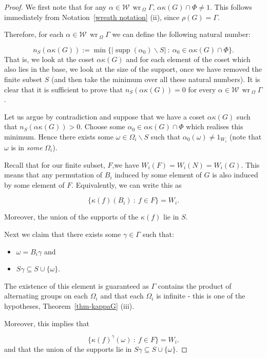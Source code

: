 \documentclass[11pt,a4paper]{amsart}
\renewcommand{\setminus}{\smallsetminus}
\theoremstyle{definition}
\theoremstyle{remark}
\newcommand{\supp}{\operatorname{supp}}
\renewcommand{\wr}{\operatorname{\,wr\,}}
\begin{document}
\begin{proof}
We first note that for any $\alpha \in \mathcal{W}\wr_\Omega \Gamma$, $\alpha \kappa(G) \cap \Phi \neq 1$. This follows immediately from Notation~\ref{wreath notation} (ii), since $\rho(G) = \Gamma$. 

Therefore, for each $\alpha \in \mathcal{W}\wr_\Omega \Gamma$ we can define the following natural number: 

$$
n_S(\alpha \kappa(G)) := \min  \{ |\supp(\alpha_0) \setminus S| \ : \ \alpha_0 \in  \alpha \kappa(G) \cap \Phi \}.  
$$
That is, we look at the coset $\alpha \kappa(G)$ and for each element of the coset which also lies in the base, we look at the size of the support, once we have removed the finite subset $S$ (and then take the minimum over all these natural numbers). It is clear that it is sufficient to prove that $n_S(\alpha \kappa(G)) = 0 $ for every $\alpha \in \mathcal{W}\wr_\Omega \Gamma$. 

Let us argue by contradiction and suppose that we have a coset $\alpha \kappa(G)$ such that $n_S(\alpha \kappa(G)) > 0 $. Choose some $\alpha_0 \in  \alpha \kappa(G) \cap \Phi$ which realises this minimum. Hence there exists some $\omega \in \Omega_i \setminus S$ such that $\alpha_0(\omega) \neq 1_{W_i}$ (note that $\omega$ is in \emph{some } $\Omega_i$). 


Recall that for our finite subset, $F$,we have $W_i(F) = W_i(N)=W_i(G)$. This means that any permutation of $B_i$ induced by some element of $G$ is also induced by some element of $F$. Equivalently, we can write this as

$$
\{ \kappa(f) (B_i) \ : \ f \in F \} = W_i. 
$$

Moreover, the union of the supports of the $\kappa(f)$ lie in $S$. 

Next we claim that there exists some $\gamma \in \Gamma$ such that:
\begin{itemize}
	\item $\omega  = B_i \gamma$ and 
	\item $S \gamma \subseteq S \cup \{ \omega \}$. 
\end{itemize}

The existence of this element is guaranteed as $\Gamma$ contains the product of alternating groups on each $\Omega_i$ and that each $\Omega_i$ is infinite - this is one of the hypotheses, Theorem~\ref{thm-kappaG} (iii). 


Moreover, this implies that 

$$
\{ \kappa(f)^{\gamma} (\omega) \ : \ f \in F \} = W_i. 
$$
and that the union of the supports lie in $S \gamma \subseteq S \cup \{ \omega\}$. 


\end{proof}
\end{document}
